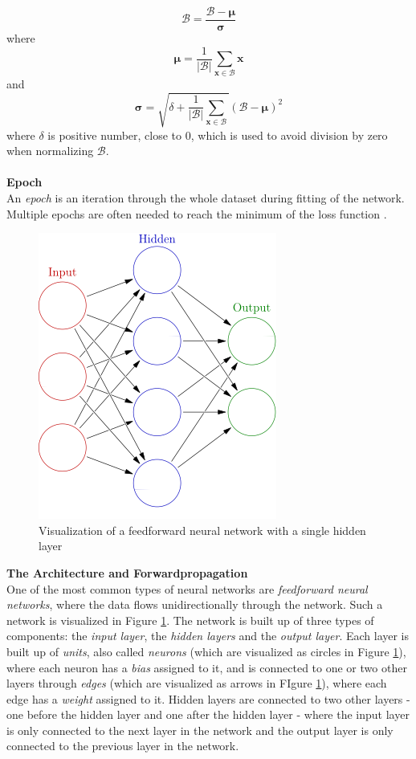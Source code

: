 \documentclass[main.tex]{subfiles}
\begin{document}
$$\bm{\mathcal{B}} = \frac{\bm{\mathcal{B}} - \bm{\mu}}{\bm{\sigma}}$$
where
$$\bm{\mu} = \frac{1}{|\bm{\mathcal{B}}|} \sum_{\bm{x} \in \bm{\mathcal{B}}} \bm{x}$$
and
$$\bm{\sigma} = \sqrt{\delta + \frac{1}{|\bm{\mathcal{B}}|} \sum_{\bm{x} \in \bm{\mathcal{B}}}} \left(\bm{\mathcal{B}} - \bm{\mu} \right)^2$$
where $\delta$ is positive number, close to $0$, which is used to avoid division by zero when normalizing $\bm{\mathcal{B}}$.
\\
\\
\textbf{Epoch} \\
An \textit{epoch} is an iteration through the whole dataset during fitting of the network. Multiple epochs are often needed to reach the minimum of the loss function \cite{d2l}.

\begin{figure}[H]
    \centering
    \includegraphics[height = 5 cm]{entities/feed_forward_nn.jpg}
    \caption{Visualization of a feedforward neural network with a single hidden layer \cite{feedforward_nn}}
    \label{feedforward_nn}
\end{figure}
\noindent \textbf{The Architecture and Forwardpropagation} \\
One of the most common types of neural networks are \textit{feedforward neural networks}, where the data flows unidirectionally through the network. Such a network is visualized in Figure \ref{feedforward_nn}. The network is built up of three types of components: the \textit{input layer}, the \textit{hidden layers} and the \textit{output layer}. Each layer is built up of \textit{units}, also called \textit{neurons} (which are visualized as circles in Figure \ref{feedforward_nn}), where each neuron has a \textit{bias} assigned to it, and is connected to one or two other layers through \textit{edges} (which are visualized as arrows in FIgure \ref{feedforward_nn}), where each edge has a \textit{weight} assigned to it. Hidden layers are connected to two other layers - one before the hidden layer and one after the hidden layer - where the input layer is only connected to the next layer in the network and the output layer is only connected to the previous layer in the network. \\
\end{document}
